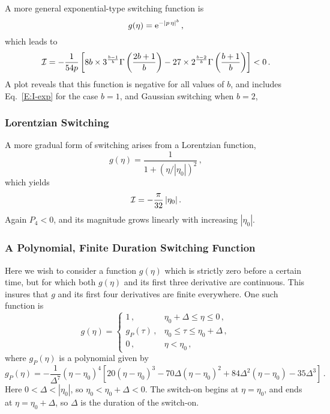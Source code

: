 \documentclass[preprint,prd,showpacs,superscriptaddress]{revtex4}
\begin{document}
 A more general exponential-type switching function is
 \begin{equation}
g(\eta) = {\rm e}^{-|p\, \eta |^b}\,,
\end{equation}
 which leads to 
 \begin{equation}
{\cal I}  =- \frac{1}{54p}\left[8 b\times3^{\frac{b-1}{b}}\Gamma \left(\frac{2 b+1}{b}\right)
-27\times2^{\frac{b-2}{b}}\Gamma \left(\frac{b+1}{b}\right)\right]<0\,.
\end{equation}
A plot reveals that this function is negative for all values of $b$, and includes Eq.~\eqref{E:I-exp} for the case
$b =1$, and Gaussian switching when   $b =2$,

 \subsubsection{Lorentzian Switching}

A more gradual form of switching arises from a Lorentzian function,
\begin{equation}
g(\eta)=\frac{1}{1+(\eta/|\eta_0| )^{2}}\,,
\end{equation}
which yields
\begin{equation}
{\cal I}  =-\frac{\pi}{32}\,|\eta_0| \,.
\end{equation}
Again  $P_4 < 0$, and its magnitude grows linearly with increasing $|\eta_0|$.

 \subsubsection{A Polynomial, Finite Duration Switching Function}
 
 Here we wish to consider a function $g(\eta)$ which is strictly zero before a certain time, but for which both $g(\eta)$
 and its first three derivative are continuous. This insures that $g$ and its first four derivatives are finite everywhere.
 One such function is 
 \begin{equation}
			g(\eta)=\begin{cases}
						1\,,&\eta_{0}+\Delta\leq\eta\leq0\,,\\
						g_{P}(\tau)\,,&\eta_{0}\leq\tau\leq\eta_{0}+\Delta\,,\\
						0\,,&\eta<\eta_{0}\,,
						\label{E:poly}
					\end{cases}
		\end{equation}
where $g_{P}(\eta)$ is a polynomial given by
\begin{equation}
g_{P}(\eta)=-\frac{1}{\Delta^{7}}\left(\eta-\eta_{0}\right)^{4}\left[20\left(\eta-\eta_{0}\right)^{3}-70\Delta\left(\eta-\eta_{0}\right)^{2}+84\Delta^{2}\left(\eta-\eta_{0}\right)-35\Delta^{3}\right]\,.
\end{equation} 
 Here $0 <  \Delta < |\eta_0|$, so $\eta_0 < \eta_{0}+\Delta < 0$. The switch-on begins at $\eta = \eta_0$, and ends at
 $\eta =  \eta_{0}+\Delta$, so $\Delta$ is the duration of the switch-on. 
 
\end{document}

